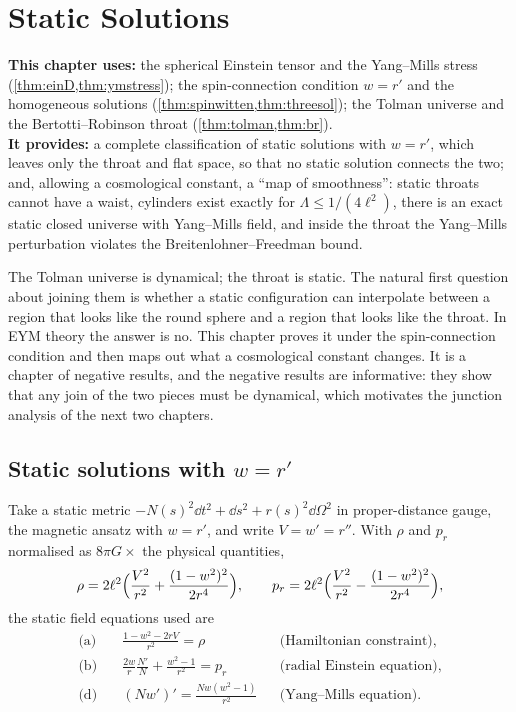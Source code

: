 \chapter{Static Solutions}
\label{ch:static}

\begin{usesbox}
\textbf{This chapter uses:} the spherical Einstein tensor and the Yang--Mills stress (\cref{thm:einD,thm:ymstress}); the spin-connection condition $w=r'$ and the homogeneous solutions (\cref{thm:spinwitten,thm:threesol}); the Tolman universe and the Bertotti--Robinson throat (\cref{thm:tolman,thm:br}).\\
\textbf{It provides:} a complete classification of static solutions with $w=r'$, which leaves only the throat and flat space, so that no static solution connects the two; and, allowing a cosmological constant, a ``map of smoothness'': static throats cannot have a waist, cylinders exist exactly for $\Lambda\le1/(4\ell^2)$, there is an exact static closed universe with Yang--Mills field, and inside the throat the Yang--Mills perturbation violates the Breitenlohner--Freedman bound.
\end{usesbox}

The Tolman universe is dynamical; the throat is static. The natural first question about joining them is whether a static configuration can interpolate between a region that looks like the round sphere and a region that looks like the throat. In EYM theory the answer is no. This chapter proves it under the spin-connection condition and then maps out what a cosmological constant changes. It is a chapter of negative results, and the negative results are informative: they show that any join of the two pieces must be dynamical, which motivates the junction analysis of the next two chapters.

\section{Static solutions with \texorpdfstring{$w=r'$}{w=r'}}

Take a static metric $-N(s)^2\dd t^2+\dd s^2+r(s)^2\dd\Omega^2$ in proper-distance gauge, the magnetic ansatz with $w=r'$, and write $V=w'=r''$. With $\rho$ and $p_r$ normalised as $8\pi G\times$ the physical quantities,
\[
\rho=2\ell^2\Bigl(\frac{V^2}{r^2}+\frac{(1-w^2)^2}{2r^4}\Bigr),\qquad p_r=2\ell^2\Bigl(\frac{V^2}{r^2}-\frac{(1-w^2)^2}{2r^4}\Bigr),
\]
the static field equations used are
\begin{align*}
\text{(a)}\quad&\frac{1-w^2-2rV}{r^2}=\rho &&\text{(Hamiltonian constraint)},\\
\text{(b)}\quad&\frac{2w}{r}\frac{N'}{N}+\frac{w^2-1}{r^2}=p_r &&\text{(radial Einstein equation)},\\
\text{(d)}\quad&(Nw')'=\frac{Nw(w^2-1)}{r^2} &&\text{(Yang--Mills equation)}.
\end{align*}

